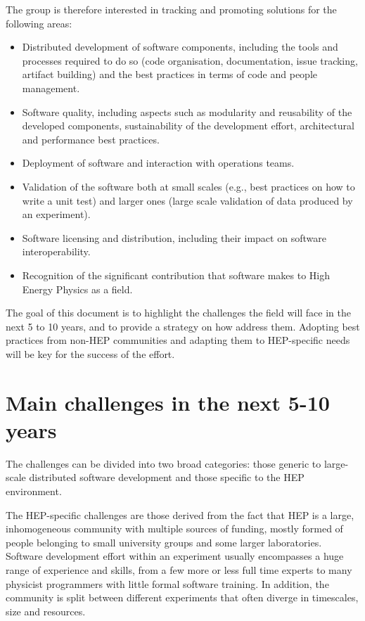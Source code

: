 \documentclass[12pt,a4paper]{article}
\begin{document}
The group is therefore interested in tracking and promoting solutions
for the following areas:

\begin{itemize}
\item
    Distributed development of software components, including the tools
  and processes required to do so (code organisation, documentation,
  issue tracking, artifact building) and the best practices in terms of
  code and people management.
  \item
    Software quality, including aspects such as modularity and reusability
  of the developed components, sustainability of the development effort,
  architectural and performance best practices.
  \item
    Deployment of software and interaction with operations teams.
  \item
    Validation of the software both at small scales (e.g., best practices
  on how to write a unit test) and larger ones (large scale validation
  of data produced by an experiment).
  \item
    Software licensing and distribution, including their impact on
  software interoperability.
  \item
    Recognition of the significant contribution that software makes to
  High Energy Physics as a field.
\end{itemize}

The goal of this document is to highlight the challenges the field will
face in the next 5 to 10 years, and to provide a strategy on how address
them. Adopting best practices from non-HEP communities and adapting them
to HEP-specific needs will be key for the success of the effort.

\hypertarget{main-challenges-in-the-next-5-10-years}{%
\section{Main challenges in the next 5-10
years}\label{main-challenges-in-the-next-5-10-years}}

The challenges can be divided into two broad categories: those generic
to large-scale distributed software development and those specific to
the HEP environment.

The HEP-specific challenges are those derived from the fact that HEP is
a large, inhomogeneous community with multiple sources of funding,
mostly formed of people belonging to small university groups and some
larger laboratories. Software development effort within an experiment
usually encompasses a huge range of experience and skills, from a few
more or less full time experts to many physicist programmers with little
formal software training. In addition, the community is split between
different experiments that often diverge in timescales, size and
resources.
\end{document}
